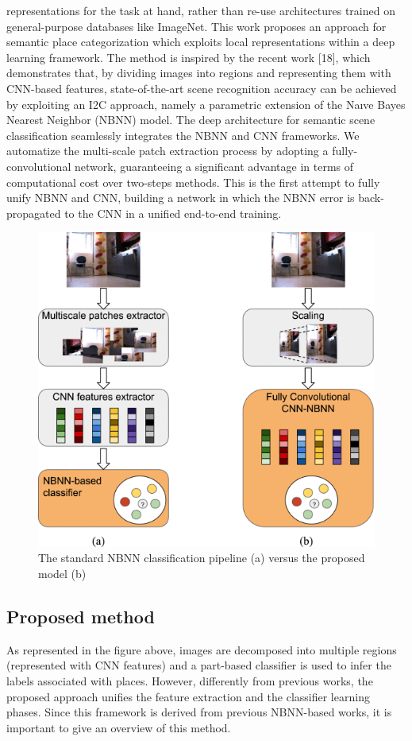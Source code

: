 representations for the task at hand, rather than re-use architectures
trained on general-purpose databases like ImageNet. This work proposes
an approach for semantic place categorization which exploits local
representations within a deep learning framework. The method is inspired
by the recent work {[}18{]}, which demonstrates that, by dividing images
into regions and representing them with CNN-based features,
state-of-the-art scene recognition accuracy can be achieved by
exploiting an I2C approach, namely a parametric extension of the Naıve
Bayes Nearest Neighbor (NBNN) model. The deep architecture for semantic
scene classification seamlessly integrates the NBNN and CNN frameworks.
We automatize the multi-scale patch extraction process by adopting a
fully-convolutional network, guaranteeing a significant advantage in
terms of computational cost over two-steps methods. This is the first
attempt to fully unify NBNN and CNN, building a network in which the
NBNN error is back-propagated to the CNN in a unified end-to-end
training.

\begin{figure}[h!]
\centering
\includegraphics[width=0.6\linewidth]{images/NBNNdiff.png}
\caption{The standard NBNN classification pipeline (a) versus the proposed model (b)}
\end{figure}

\subsection{Proposed method}\label{header-n671}

As represented in the figure above, images are decomposed into multiple
regions (represented with CNN features) and a part-based classifier is
used to infer the labels associated with places. However, differently
from previous works, the proposed approach unifies the feature
extraction and the classifier learning phases. Since this framework is
derived from previous NBNN-based works, it is important to give an
overview of this method.

